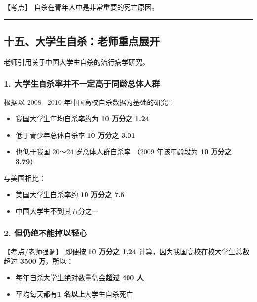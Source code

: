 \documentclass[
  chinese,
  9pt,
  a4paper,
]{ctexart}
\providecommand{\tightlist}{%
  \setlength{\itemsep}{0pt}\setlength{\parskip}{0pt}}
\begin{document}
【考点】 自杀在青年人中是非常重要的死亡原因。

\begin{center}\rule{0.5\linewidth}{0.5pt}\end{center}

\subsection{十五、大学生自杀：老师重点展开}\label{ux5341ux4e94ux5927ux5b66ux751fux81eaux6740ux8001ux5e08ux91cdux70b9ux5c55ux5f00}

老师引用关于中国大学生自杀的流行病学研究。

\subsubsection{1.
大学生自杀率并不一定高于同龄总体人群}\label{ux5927ux5b66ux751fux81eaux6740ux7387ux5e76ux4e0dux4e00ux5b9aux9ad8ux4e8eux540cux9f84ux603bux4f53ux4ebaux7fa4}

根据以 2008---2010 年中国高校自杀数据为基础的研究：

\begin{itemize}
\tightlist
\item
  我国大学生年均自杀率约为 \textbf{10 万分之 1.24}
\item
  低于青少年总体自杀率 \textbf{10 万分之 3.01}
\item
  也低于我国 20～24 岁总体人群自杀率 （2009 年该年龄段为 \textbf{10
  万分之 3.79}）
\end{itemize}

与美国相比：

\begin{itemize}
\tightlist
\item
  美国大学生自杀率约 \textbf{10 万分之 7.5}
\item
  中国大学生不到其五分之一
\end{itemize}

\subsubsection{2.
但仍绝不能掉以轻心}\label{ux4f46ux4ecdux7eddux4e0dux80fdux6389ux4ee5ux8f7bux5fc3}

【考点/老师强调】 即便按 \textbf{10 万分之 1.24}
计算，因为我国高校在校大学生总数超过 \textbf{3500 万}，所以：

\begin{itemize}
\tightlist
\item
  每年自杀大学生绝对数量仍会\textbf{超过 400 人}
\item
  平均每天都有\textbf{1 名以上}大学生自杀死亡
\end{itemize}
\end{document}

